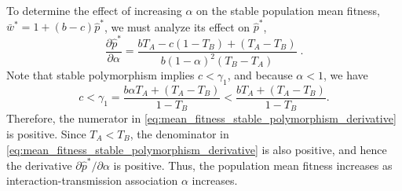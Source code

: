\documentclass[12pt]{extarticle}
\begin{document}
\begin{appendices}
To determine the effect of increasing $\alpha$ on the stable population mean fitness, $\bar{w}^*=1+(b-c)\hat{p}^*$, we must analyze its effect on $\hat{p}^*$, 
\begin{equation} \label{eq:mean_fitness_stable_polymorphism_derivative}
  \frac{\partial \hat{p}^*}{\partial \alpha} 
  = \frac{b T_A - c(1-T_B) + (T_A-T_B)}{b (1-\alpha)^2 (T_B-T_A)} \;.
\end{equation} 
Note that stable polymorphism implies $c<\gamma_1$, and because $\alpha<1$, we have
\begin{equation}
c < \gamma_1 = \frac{b \alpha T_A + (T_A-T_B)}{1-T_B} < \frac{b T_A + (T_A-T_B)}{1-T_B}.
\end{equation} 
Therefore, the numerator in \autoref{eq:mean_fitness_stable_polymorphism_derivative} is positive.
Since $T_A<T_B$, the denominator in \autoref{eq:mean_fitness_stable_polymorphism_derivative} is also positive, and hence the derivative $\partial \hat{p}^* / \partial \alpha$ is positive.
Thus, the population mean fitness increases as interaction-transmission association $\alpha$ increases.



\

\end{appendices}
\end{document}
